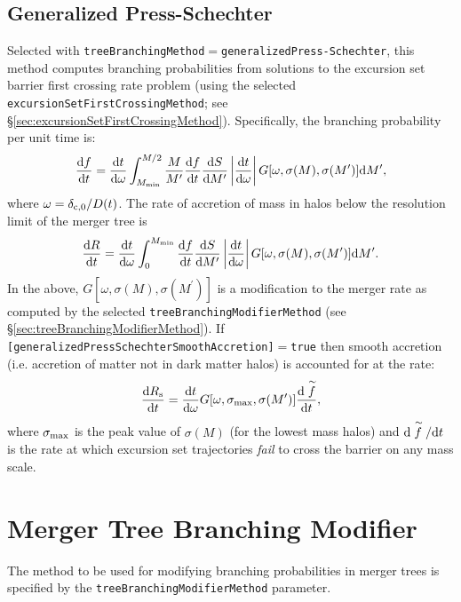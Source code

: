 \subsection{Generalized Press-Schechter}

Selected with {\tt treeBranchingMethod}$=${\tt generalizedPress-Schechter}, this method computes branching probabilities from solutions to the excursion set barrier first crossing rate problem (using the selected {\tt excursionSetFirstCrossingMethod}; see \S\ref{sec:excursionSetFirstCrossingMethod}). Specifically, the branching probability per unit time is:
\begin{equation}
 {\d f \over \d t} = {{\rm d} t \over {\rm d}\omega} \int_{M_{\rm min}}^{M/2} {M \over M^\prime} {\d f \over \d t} {\d S \over \d M^\prime} \left| {\d t \over \d \omega}\right| G[\omega,\sigma(M),\sigma(M^\prime)] \d M^\prime,
\end{equation}
where $\omega = \delta_{\rm c,0}/D(t)$. The rate of accretion of mass in halos below the resolution limit of the merger tree is
\begin{equation}
 {\d R \over \d t} =  {{\rm d} t \over {\rm d}\omega} \int_0^{M_{\rm min}} {\d f \over \d t} {\d S \over \d M^\prime} \left| {\d t \over \d \omega}\right| G[\omega,\sigma(M),\sigma(M^\prime)] \d M^\prime.
\end{equation}
In the above, $G[\omega,\sigma(M),\sigma(M^\prime)]$ is a modification to the merger rate as computed by the selected {\tt treeBranchingModifierMethod} (see \S\ref{sec:treeBranchingModifierMethod}). If {\tt [generalizedPressSchechterSmoothAccretion]}$=${\tt true} then smooth accretion (i.e. accretion of matter not in dark matter halos) is accounted for at the rate:
\begin{equation}
 {\d R_{\rm s} \over \d t} =  {{\rm d} t \over {\rm d}\omega} G[\omega,\sigma_{\rm max},\sigma(M^\prime)] {\d \stackrel{\sim}{f} \over \d t},
\end{equation}
where $\sigma_{\rm max}$ is the peak value of $\sigma(M)$ (for the lowest mass halos) and $\d \stackrel{\sim}{f}/\d t$ is the rate at which excursion set trajectories \emph{fail} to cross the barrier on any mass scale.


\section{Merger Tree Branching Modifier}

The method to be used for modifying branching probabilities in merger trees is specified by the {\tt treeBranchingModifierMethod} parameter.


